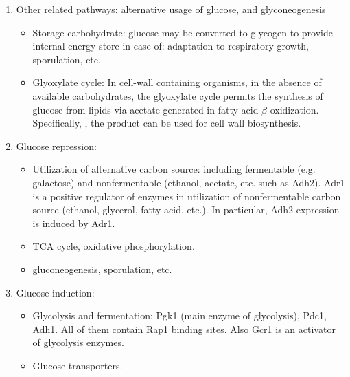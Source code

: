 \documentclass{report}
\begin{document}
\begin{enumerate}
	\item Other related pathways: alternative usage of glucose, and glyconeogenesis
	\begin{itemize}
		\item Storage carbohydrate: glucose may be converted to glycogen to provide internal energy store in case of: adaptation to respiratory growth, sporulation, etc. 
		\item Glyoxylate cycle: In cell-wall containing organisms, in the absence of available carbohydrates, the glyoxylate cycle permits the synthesis of glucose from lipids via acetate generated in fatty acid $\beta$-oxidization. Specifically, , the product can be used for cell wall biosynthesis. 
	\end{itemize}
	
	\item Glucose repression: 
	\begin{itemize}
		\item Utilization of alternative carbon source: including fermentable (e.g. galactose) and nonfermentable (ethanol, acetate, etc. such as Adh2). Adr1 is a positive regulator of enzymes in utilization of nonfermentable carbon source (ethanol, glycerol, fatty acid, etc.). In particular, Adh2 expression is induced by Adr1. 
		\item TCA cycle, oxidative phosphorylation. 
		\item gluconeogenesis, sporulation, etc. 
	\end{itemize}
	
	\item Glucose induction: 
	\begin{itemize}
		\item Glycolysis and fermentation: Pgk1 (main enzyme of glycolysis), Pdc1, Adh1. All of them contain Rap1 binding sites. Also Gcr1 is an activator of glycolysis enzymes. 
		\item Glucose transporters. 
	\end{itemize}
\end{enumerate}
\end{document}
